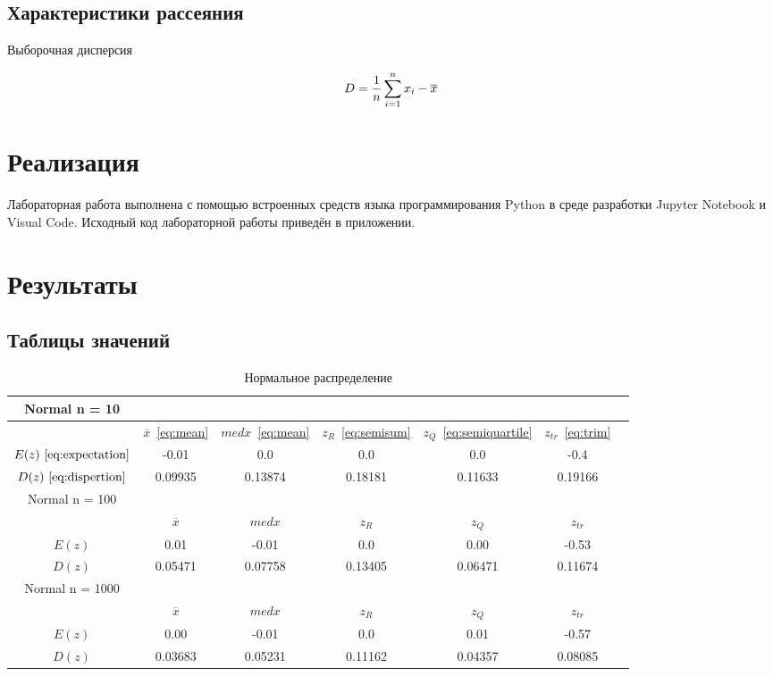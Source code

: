 \documentclass[12pt,a4paper]{scrartcl}
\begin{document}
\subsection{Характеристики рассеяния}
Выборочная дисперсия

\begin{equation}\label{eq:samplevariance}
\centering
D = \frac{1}{n} \sum_{i=1}^{n} x_i - \overline x
\end{equation}

\section {Реализация}
Лабораторная работа выполнена с помощью встроенных средств языка программирования Python в среде разработки Jupyter Notebook и Visual Code. Исходный код лабораторной
работы приведён в приложении.

\section {Результаты}

\subsection{Таблицы значений}

\begin{table}[H]
  \centering
  \begin{tabular}{ | c | c | c | c | c | c | c | }
	\hline
	Normal n = 10 & & & & &  \\ \hline
	& $\overline x$~\eqref{eq:mean} & $med x$~\eqref{eq:mean}& $z_R $~\eqref{eq:semisum} & $z_Q $~\eqref{eq:semiquartile}  &  $z_{tr}$~\eqref{eq:trim}  \\ \hline
	$E(z) ~\eqref{eq:expectation}$ & -0.01 & 0.0 & 0.0 & 0.0 & -0.4 \\ \hline
	$D(z) ~\eqref{eq:dispertion}$ & 0.09935 & 0.13874 & 0.18181 & 0.11633 & 0.19166 \\ \hline
	
	Normal n = 100 & & & & &  \\ \hline
	& $\overline x$ & $med x$& $z_R $& $z_Q $&  $z_{tr}$\\ \hline
	$E(z)$ & 0.01 & -0.01 & 0.0 & 0.00 & -0.53 \\ \hline
	$D(z)$ & 0.05471 & 0.07758 & 0.13405 & 0.06471 & 0.11674 \\ \hline
	
	Normal n = 1000 & & & & &  \\ \hline
	& $\overline x$ & $med x$& $z_R $& $z_Q $&  $z_{tr}$\\ \hline
	$E(z)$ & 0.00 & -0.01 & 0.0 & 0.01 &-0.57 \\ \hline
	$D(z)$ & 0.03683 & 0.05231 & 0.11162 & 0.04357 & 0.08085 \\ \hline
	\end{tabular}
  \label{table:normal_table}
\caption{Нормальное распределение}
\end{table}
\end{document}
